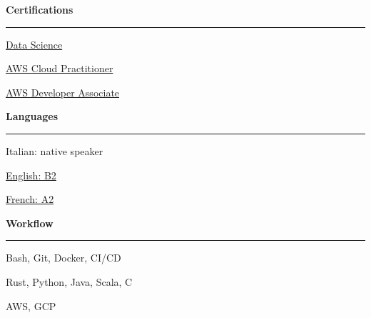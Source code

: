 \documentclass[11pt,letterpaper]{article}
\begin{document}
\begin{justify}
\begin{multicols}{3}
		\textbf{Certifications}\strut
		\hrule
		\begin{itemize}[label={}, itemsep=-5pt, leftmargin=0pt]
			\begin{item}
			      \href{https://dariocurr.github.io/assets/doc/data_science.pdf}{Data Science}
			\end{item}
			\begin{item}
			      \href{https://www.credly.com/badges/33614ca6-2f0d-456b-87e9-bf8b8591cbf8/public_url}{AWS Cloud Practitioner}
			\end{item}
			\begin{item}
			      \href{https://www.credly.com/badges/e9b6c64c-2175-4345-950b-6331fd88af43/public_url}{AWS Developer Associate}
			\end{item}
		\end{itemize}
		\vspace*{\fill}
		\columnbreak
		\textbf{Languages}\strut
		\hrule
		\begin{itemize}[label={}, itemsep=-5pt, leftmargin=0pt]
			\begin{item}
			      Italian: native speaker
			\end{item}
			\begin{item}
			      \href{https://dariocurr.github.io/assets/doc/B2_english.pdf}{English: B2}
			\end{item}
			\begin{item}
			      \href{https://dariocurr.github.io/assets/doc/A2_french.pdf}{French: A2}
			\end{item}
		\end{itemize}
		\vspace*{\fill}
		\columnbreak
		\textbf{Workflow}\strut
		\hrule
		\begin{itemize}[label={}, itemsep=-5pt, leftmargin=0pt]
			\begin{item}
			      Bash, Git, Docker, CI/CD
			\end{item}
			\begin{item}
			      Rust, Python, Java, Scala, C
			\end{item}
			\begin{item}
			      AWS, GCP
			\end{item}
		\end{itemize}
		\vspace*{\fill}
	\end{multicols}
\end{justify}
\end{document}
